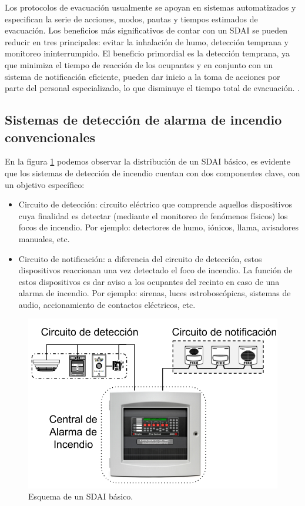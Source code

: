 Los protocolos de evacuación usualmente se apoyan en sistemas automatizados y especifican la serie de acciones, modos, pautas y tiempos estimados de evacuación. Los beneficios más significativos de contar con un SDAI se pueden reducir en tres principales: evitar la inhalación de humo, detección temprana y monitoreo ininterrumpido. El beneficio primordial es la detección temprana, ya que minimiza el tiempo de reacción de los ocupantes y en conjunto con un sistema de notificación eficiente, pueden dar inicio a la toma de acciones por parte del personal especializado, lo que disminuye el tiempo total de evacuación. \citep{utn_1}\citep{plan_evac}.
\subsection{Sistemas de detección de alarma de incendio convencionales}
%

En la figura \ref{fig:sdai_conv} podemos observar la distribución de un SDAI básico, es evidente que los sistemas de detección de incendio cuentan con dos componentes clave, con un objetivo específico:
\begin{itemize}
\item Circuito de detección: circuito eléctrico que comprende aquellos dispositivos cuya finalidad es detectar (mediante el monitoreo de fenómenos físicos) los focos de incendio. Por ejemplo: detectores de humo, iónicos, llama, avisadores manuales, etc.
\item Circuito de notificación: a diferencia del circuito de detección, estos dispositivos reaccionan una vez detectado el foco de incendio. La función de estos dispositivos es dar aviso a los ocupantes del recinto en caso de una alarma de incendio. Por ejemplo: sirenas, luces estroboscópicas, sistemas de audio, accionamiento de contactos eléctricos, etc.
\end{itemize}
\begin{figure}[ht]
    \centering
    \includegraphics[scale=.45]{./Figures/sdai_conv.png}
    \caption{Esquema de un SDAI básico.}
    \label{fig:sdai_conv}
\end{figure}


